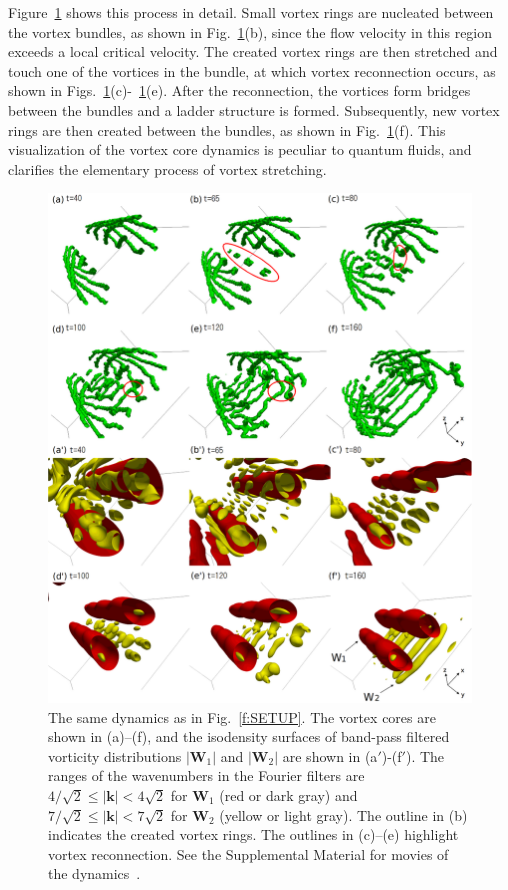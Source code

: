\documentclass[aps,onecolumn,pra,longbibliography]{revtex4}
\begin{document}
	Figure~\ref{f:MODEL} shows this process in detail.
	Small vortex rings are nucleated between the vortex bundles,
	as shown in Fig.~\ref{f:MODEL}(b),
	since the flow velocity in this region exceeds a local critical velocity.
    	The created vortex rings are then stretched and touch one
	of the vortices in the bundle, at which vortex reconnection occurs,
	as shown in Figs.~\ref{f:MODEL}(c)-~\ref{f:MODEL}(e).
	After the reconnection, the vortices form bridges
	between the bundles and a ladder structure is formed.
	Subsequently, new vortex rings are then created between the bundles,
	as shown in Fig.~\ref{f:MODEL}(f).
	This visualization of the vortex core dynamics
	is peculiar to quantum fluids,
	and clarifies the elementary process of vortex stretching.
	\begin{figure}[t]
		\centering
		\includegraphics[width=14cm]{FIG2.eps}
		\caption{
			The same dynamics as in Fig.~\ref{f:SETUP}.
			The vortex cores are shown in (a)--(f),
			and the isodensity surfaces of band-pass filtered vorticity distributions
			$|\bm{W}_1|$ and $|\bm{W}_2|$ are shown in (a$'$)-(f$'$).
			The ranges of the wavenumbers in the Fourier filters are
			$4/\sqrt{2}\leq |\bm{k}| <4\sqrt{2}$ for $\bm{W}_1$ (red or dark gray)
			and $7/\sqrt{2}\leq |\bm{k}| < 7\sqrt{2}$ for $\bm{W}_2$ (yellow or light gray).
			The outline in (b) indicates the created vortex rings.
			The outlines in (c)--(e) highlight vortex reconnection.
			See the Supplemental Material for movies of the dynamics~\cite{SM}.
		}
		\label{f:MODEL}
	\end{figure}
\end{document}
